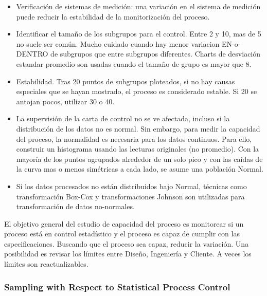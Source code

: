 \documentclass[]{article}
\begin{document}
\begin{itemize}
	\item Verificación de sistemas de medición: una variación en el sistema de medición puede reducir la estabilidad de la monitorización del proceso. 
	\item Identificar el tamaño de los subgrupos para el control. Entre 2 y 10, mas de 5 no suele ser común. Mucho cuidado cuando hay menor variacion EN-o-DENTRO de subgrupos que entre subgrupos diferentes. Charts de desviación estandar promedio son usadas cuando el tamaño de grupo es mayor que 8.
	\item Estabilidad. Tras 20 puntos de subgrupos ploteados, si no hay causas especiales que se hayan mostrado, el proceso es considerado estable. Si 20 se antojan pocos, utilizar 30 o 40.
	\item La supervisión de la carta de control no se ve afectada, incluso si la distribución de los datos no es normal. Sin embargo, para medir la capacidad del proceso, la normalidad es necesaria para los datos continuos. \newline Para ello, construir un histograma usando las lecturas originales (no promedio). Con la mayoría de los puntos agrupados alrededor de un solo pico y con las caídas de la curva mas o menos simétricas a cada lado, se asume una población Normal.
	\item Si los datos procesados no están distribuidos bajo Normal, técnicas como transformación Box-Cox y transformaciones Johnson son utilizadas para transformación de datos no-normales.
\end{itemize}

El objetivo general del estudio de capacidad del proceso es monitorear si un proceso está en control estadístico y el proceso es capaz de cumplir con las especificaciones. Buscando que el proceso sea capaz, reducir la variación. Una posibilidad es revisar los límites entre Diseño, Ingeniería y Cliente. A veces los límites son reactualizables.

\subsubsection{Sampling with Respect to Statistical Process Control}
\end{document}

